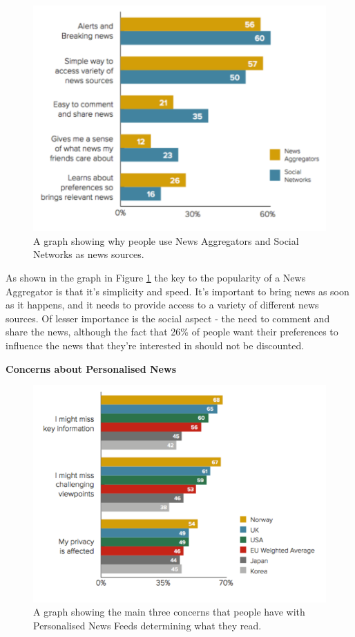 \documentclass[12pt]{article}
\begin{document}
\begin{figure}[h]
  \centering
    \includegraphics[scale=0.6]{WhySocialAggregatedNews.png}
   \caption[Why people use News Aggregators]{A graph showing why people use News Aggregators and Social Networks as news sources.}
   \label{WhySocialAggregatedNews}
\end{figure}

As shown in the graph in Figure \ref{WhySocialAggregatedNews} the key to the popularity of a News Aggregator is that it's simplicity and speed. It's important to bring news as soon as it happens, and it needs to provide access to a variety of different news sources. Of lesser importance is the social aspect - the need to comment and share the news, although the fact that 26\% of people want their preferences to influence the news that they're interested in should not be discounted.

\textbf{Concerns about Personalised News}

\begin{figure}[h]
  \centering
    \includegraphics[scale=0.6]{PersonalisedNewsConcerns.png}
   \caption[Concerns with personalisation of News Feeds]{A graph showing the main three concerns that people have with Personalised News Feeds determining what they read.}
   \label{PersonalisedNewsConcerns}
\end{figure}
\end{document}
